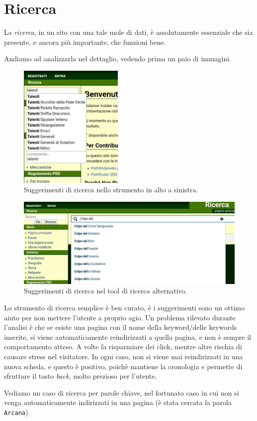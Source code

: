 \section{Ricerca}

La \emph{ricerca}, in un sito con una tale mole di dati, è assolutamente essenziale che sia 
presente, e ancora più importante, che funzioni bene.

Andiamo ad analizzarla nel dettaglio, vedendo prima un paio di immagini.

\begin{figure}[hbt]
    \centering
    \includegraphics[width=5cm]{img/ricerca1.jpg}
    \caption{Suggerimenti di ricerca nello strumento in alto a sinistra.}
\end{figure}

\begin{figure}[hbt]
    \centering
    \includegraphics[width=\textwidth]{img/ricerca2.jpg}
    \caption{Suggerimenti di ricerca nel tool di ricerca alternativo.}
\end{figure}

Lo strumento di ricerca semplice è ben curato, è i suggerimenti sono un ottimo aiuto per non mettere l'utente a proprio agio.
Un problema rilevato durante l'analisi è che se esiste una pagina con il nome della keyword/delle keywords inserite,
si viene automaticamente reindirizzati a quella pagina, e non è sempre il comportamento atteso. A volte fa risparmiare dei click,
mentre altre rischia di causare stress nel visitatore. In ogni caso, non si viene mai reindirizzati in una nuova scheda, e questo
è positivo, poichè mantiene la cronologia e permette di sfruttare il tasto \emph{back}, molto prezioso per l'utente.\par
\smallskip
Vediamo un caso di ricerca per parole chiave, nel fortunato caso in cui non si venga automaticamente indirizzati in
una pagina (è stata cercata la parola \texttt{Arcana}).

